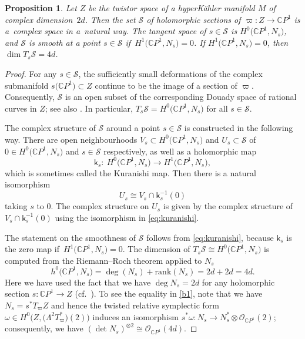 \documentclass[pdftex]{sigma}
\numberwithin{equation}{section}
\newtheorem{Proposition}[Theorem]{Proposition}
\theoremstyle{definition}
\newcommand\C{{\mathbb C}}
\begin{document}
\begin{Proposition}\label{prop:SpaceOfSections}
Let $Z$ be the twistor space of a hyperK\"ahler manifold $M$ of complex dimension~$2d$. Then the set $\mathcal{S}$ of
holomorphic sections of
$\varpi\colon Z \longrightarrow \C P^1$
is a~complex space in a~natural way. The
tangent space of $s \in
\mathcal{S}$ is $H^0\bigl({\mathbb C}P^1, N_s\bigr)$, and $\mathcal{S}$
is smooth at a point $s \in \mathcal{S}$ if~${H^1\bigl({\mathbb C}P^1, N_s\bigr) = 0}$. If
$H^1\bigl({\mathbb C}P^1, N_s\bigr) = 0$, then $\dim T_s\mathcal S = 4d$.
\end{Proposition}

\begin{proof}
For any $s \in \mathcal{S}$, the sufficiently small deformations of the complex submanifold
${s\bigl({\mathbb C}P^1\bigr) \subset Z}$ continue to be the image of a section of $\varpi$. Consequently, $\mathcal{S}$
is an open subset of the corresponding Douady space of rational curves in $Z$; see also \cite[Theorem 2]{Namba}. In particular,
$T_s\mathcal{S} = H^0\bigl({\mathbb C}P^1, N_s\bigr)$ for all $s \in \mathcal{S}$.

The complex structure of $\mathcal{S}$ around a point $s \in \mathcal{S}$ is constructed in the
following way. There are open neighbourhoods
$V_s \subset H^0\bigl({\mathbb C}P^1, N_s\bigr)$ and $
U_s \subset \mathcal{S}$
 of $0 \in H^0\bigl({\mathbb C}P^1, N_s\bigr)$ and $s \in \mathcal{S}$ respectively,
as well as a holomorphic map
\[
\mathsf{k}_s \colon \ H^0\bigl({\mathbb C}P^1, N_s\bigr) \longrightarrow H^1\bigl({\mathbb C}P^1, N_s\bigr) ,
\]
which is sometimes called the Kuranishi map.
Then there is a natural isomorphism
\begin{equation}\label{eq:kuranishi}
U_s \cong V_s\cap \mathsf{k}_s^{-1}(0)
\end{equation}
taking $s$ to $0$. The complex structure on $U_s$ is given by the complex structure of $V_s\cap \mathsf{k}_s^{-1}(0)$
using the isomorphism in \eqref{eq:kuranishi}.

The statement on the smoothness of $\mathcal S$ follows from \eqref{eq:kuranishi}, because $\mathsf{k}_s$ is the
zero map if~${H^1\bigl({\mathbb C}P^1, N_s\bigr) = 0}$. The dimension of $T_s{\mathcal S} \cong
H^0\bigl({\mathbb C}P^1, N_s\bigr)$ is computed from the Riemann--Roch theorem applied to $N_s$
\begin{equation}\label{b1}
h^0\bigl(\C P^1, N_s\bigr) = \deg(N_s) + \mathrm{rank}(N_s) = 2d + 2d = 4d.
\end{equation}
Here we have used the fact that we have $\deg N_s = 2d$ for any holomorphic section $s\colon \C P^1
\longrightarrow Z$ (cf.\ \cite{Fei01,Mayrand}).
To see the equality in \eqref{b1}, note that we have $N_s = s^*T_\varpi Z$ and hence the twisted relative symplectic form
$\omega \in H^0\bigl(Z, \bigl(\Lambda^2T_\varpi^*\bigr)(2)\bigr)$ induces an isomorphism $s^*\omega\colon N_s
\longrightarrow N_s^*\otimes \mathcal{O}_{\C P^1}(2)$; consequently, we have
$(\det N_s)^{\otimes 2} \cong \mathcal{O}_{\C P^1}(4d)$.
\end{proof}
\end{document}
